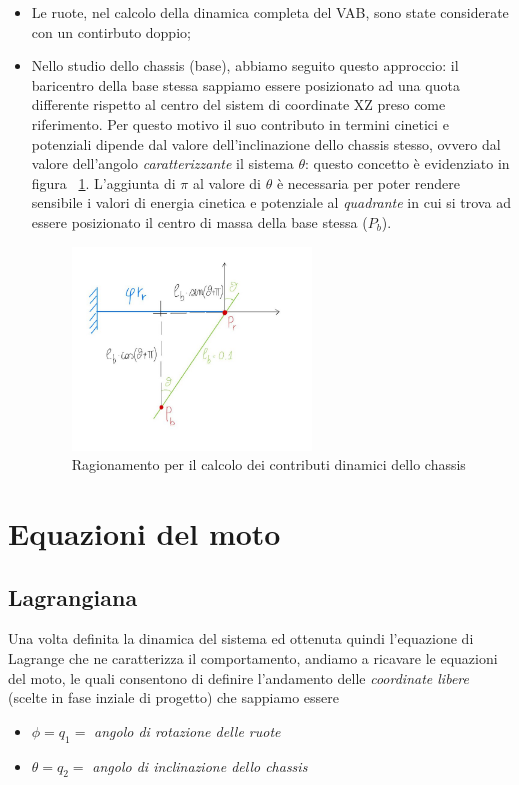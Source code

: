 \begin{itemize}
 	\item Le ruote, nel calcolo della dinamica completa del VAB, sono state considerate con un contirbuto doppio;
 	
 	\item Nello studio dello chassis (base), abbiamo seguito questo approccio: il baricentro della base stessa sappiamo essere posizionato ad una quota differente rispetto al centro del sistem di coordinate XZ preso come riferimento.
 	Per questo motivo il suo contributo in termini cinetici e potenziali dipende dal valore dell'inclinazione dello chassis stesso, ovvero dal valore dell'angolo \textit{caratterizzante} il sistema $\theta$: questo concetto è evidenziato in figura ~\ref{fig:chassis}.
 	L'aggiunta di \textit{$\pi$} al valore di $\theta$ è necessaria per poter rendere sensibile i valori di energia cinetica e potenziale al \textit{quadrante} in cui si trova ad essere posizionato il centro di massa della base stessa ($P_b$).
 	
 	\begin{figure}[h]
 		\centering   	
 		\includegraphics[width=0.6\textwidth]{Immagini/ChassisAngle.jpg}
 		\caption{Ragionamento per il calcolo dei contributi dinamici dello chassis}
 		\label{fig:chassis}
 	\end{figure}
 	
\end{itemize}

\section{Equazioni del moto}
\subsection{Lagrangiana}
Una volta definita la dinamica del sistema ed ottenuta quindi l'equazione di Lagrange che ne caratterizza il comportamento, andiamo a ricavare le equazioni del moto, le quali consentono di definire l'andamento delle \textit{coordinate libere} (scelte in fase inziale di progetto) che sappiamo essere
\begin{itemize}
	\item $\phi = q_1 =$ \textit{angolo di rotazione delle ruote}
	\item $\theta = q_2 =$ \textit{angolo di inclinazione dello chassis}
\end{itemize}

